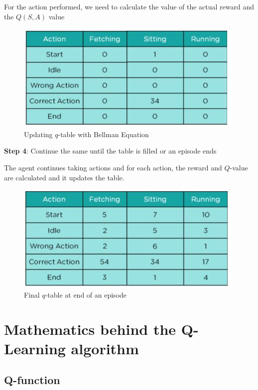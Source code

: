 For the action performed, we need to calculate the value of the actual reward and 
the $Q( S, A )$ value

\begin{figure}[H]
\centering
\includegraphics[scale=0.618]{pix/q_learning/9-updatingq.jpg}
\caption{Updating $q$-table with Bellman Equation}
\end{figure}

{\bf Step 4}: Continue the same until the table is filled or an episode ends

The agent continues taking actions and for each action, the reward and $Q$-value are 
calculated and it updates the table.

\begin{figure}[H]
\centering
\includegraphics[scale=0.618]{pix/q_learning/10-finalq.jpg}
\caption{Final $q$-table at end of an episode}
\end{figure}


%
\section{Mathematics behind the Q-Learning algorithm}
%

\subsection{Q-function}

